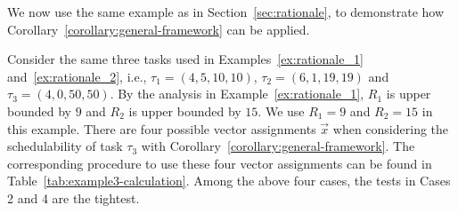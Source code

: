  We now use the same example as in Section~\ref{sec:rationale}, to demonstrate how
Corollary~\ref{corollary:general-framework} can be applied.
 
 \begin{example}
 \label{ex:general_framework}
  Consider the same three tasks used in Examples~\ref{ex:rationale_1} and~\ref{ex:rationale_2}, i.e., $\tau_1 = (4, 5, 10, 10)$, $\tau_2 =(6, 1, 19, 19)$ and $\tau_3 = (4, 0, 50, 50)$. By the analysis in Example~\ref{ex:rationale_1}, $R_1$ is upper bounded by $9$ and $R_2$ is upper bounded by $15$. We use $R_1=9$ and $R_2=15$ in this example. There are four possible vector assignments $\vec{x}$ when considering the schedulability of task $\tau_3$ with Corollary~\ref{corollary:general-framework}.
%
%       
%
%
%
The corresponding procedure to use these four vector assignments can be found in Table~\ref{tab:example3-calculation}. 
Among the above four cases, the tests in Cases 2 and 4 are the
tightest. 
\hfill\myendproof
 \end{example}

